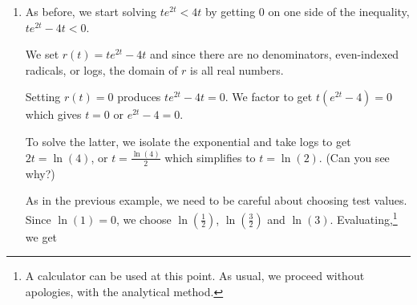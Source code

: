 \documentclass{ximera}
\begin{document}
\begin{example}
\begin{explanation}
\begin{enumerate}
\begin{image}
% 
\end{image}

From the sign diagram, we find our answer to be $(-\infty,\ln(4)) \cup [\ln(6), \infty)$.

Using desmos, we find the graph of $f(x) = \frac{e^{x}}{e^{x}-4}$ is below the graph of $g(x) = 3$ on $(-\infty,\ln(4)) \cup (\ln(6), \infty)$, and they intersect at $x  \approx 1.792 \approx  \ln(6)$.

\begin{center}
\end{center}


\item  As before, we start solving $t e^{2t} < 4t$ by getting $0$ on one side of the inequality, $t e^{2t} - 4t < 0$.   



We set $r(t) = te^{2t} - 4t$ and since there are no denominators, even-indexed radicals, or logs, the domain of $r$ is all real numbers.  



Setting $r(t) = 0$  produces $t e^{2t} - 4t  = 0$. We factor to get $t \left(e^{2t} - 4\right)  = 0$ which gives $t=0$ or $e^{2t} - 4 = 0$.  



To solve the latter, we isolate the exponential and take logs to get $2t = \ln(4)$, or $t = \frac{\ln(4)}{2}$ which simplifies to $t = \ln(2)$.  (Can you see why?)  



As in the previous example, we need to be careful about choosing test values.  Since $\ln(1) = 0$, we choose $\ln\left(\frac{1}{2}\right)$, $\ln\left(\frac{3}{2}\right)$ and $\ln(3)$.  Evaluating,\footnote{A calculator can be used at this point. As usual, we proceed without apologies, with the analytical method.} we get 


\end{enumerate}
\end{explanation}
\end{example}
\end{document}
